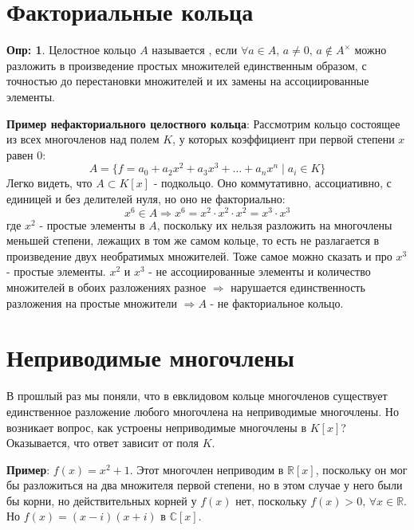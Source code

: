 \documentclass[12pt]{article}
\newcommand{\RN}[1]{%
	\textup{\uppercase\expandafter{\romannumeral#1}}%
}
\newcommand{\MR}{\mathbb{R}}
\newcommand{\MC}{\mathbb{C}}
\theoremstyle{definition}
\newtheorem{defn}{Опр:}
\begin{document}
\lhead{Алгебра-\RN{1}}

\section*{Факториальные кольца}

\begin{defn}
	Целостное кольцо $A$ называется , если $\forall a \in A, \, a\neq 0, \, a\not\in A^{\times}$ можно разложить в произведение простых множителей единственным образом, с точностью до перестановки множителей и их замены на ассоциированные элементы.
\end{defn}

\textbf{Пример нефакториального целостного кольца}: Рассмотрим кольцо состоящее из всех многочленов над полем $K$, у которых коэффициент при первой степени $x$ равен $0$:
$$
	A = \{f = a_0 + a_2x^2 + a_3x^3 + \dotsc + a_nx^n \mid a_i \in K\}
$$
Легко видеть, что $A \subset K[x]$ - подкольцо. Оно коммутативно, ассоциативно, с единицей и без делителей нуля, но оно не факториально:
$$
	x^6 \in A \Rightarrow x^6 = x^2{\cdot}x^2{\cdot}x^2 = x^3{\cdot}x^3
$$
где $x^2$ - простые элементы в $A$, поскольку их нельзя разложить на многочлены меньшей степени, лежащих в том же самом кольце, то есть не разлагается в произведение двух необратимых множителей. Тоже самое можно сказать и про $x^3$ - простые элементы. $x^2$ и $x^3$ - не ассоциированные элементы и количество множителей в обоих разложениях разное $\Rightarrow$ нарушается единственность разложения на простые множители $\Rightarrow A$ - не факториальное кольцо.

\section*{Неприводимые многочлены}
В прошлый раз мы поняли, что в евклидовом кольце многочленов существует единственное разложение любого многочлена на неприводимые многочлены. Но возникает вопрос, как устроены неприводимые многочлены в $K[x]$? Оказывается, что ответ зависит от поля $K$.

\textbf{Пример}: $f(x) = x^2 + 1$. Этот многочлен неприводим в $\MR[x]$, поскольку он мог бы разложиться на два множителя первой степени, но в этом случае у него были бы корни, но действительных корней у $f(x)$ нет, поскольку $f(x) > 0, \, \forall x \in \MR$. Но $f(x) = (x - i)(x + i)$ в $\MC[x]$. 
\end{document}

